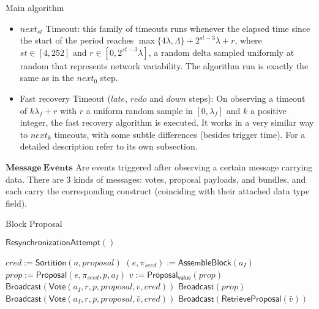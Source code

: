 \documentclass[10pt,a4paper]{article}
\begin{document}
\begin{section}{Main algorithm}
\begin{itemize}
    \item $next_{st}$ Timeout: this family of timeouts runs whenever the elapsed time since the start of the period reaches
    $\max\{4\lambda, \Lambda \} + 2^{st-3}\lambda + r$, where $st\in [4, 252]$ and $r \in [0, 2^{st-3}\lambda]$, a random 
    delta sampled uniformly at random that represents network variability.
    The algorithm run is exactly the same as in the $next_0$ step.

    \item Fast recovery Timeout ($late$, $redo$ and $down$ steps): On observing a timeout of $k\lambda_f + r$ with $r$ a uniform random sample in $[0, \lambda_f]$ and
    $k$ a positive integer, the fast recovery algorithm is executed. It works in a very similar way to $next_k$ timeouts, with some subtle differences (besides trigger time).
    For a detailed description refer to its own subsection.
\end{itemize}


$\mathbf{Message \ Events}$ Are events triggered after observing a certain message carrying data.
There are 3 kinds of messages: votes, proposal payloads, and bundles, and each carry
the corresponding construct (coinciding with their attached data type field).

\begin{subsection}{Block Proposal}\label{ssect:blockproposal}

    \begin{algorithm}
        \caption{\underline{Block Proposal}}
        \label{algo:block-proposal}
        \begin{algorithmic}[1]

            \State $\mathsf{ResynchronizationAttempt}()$

                \State $cred :=  \mathsf{Sortition}(a, proposal)$
                        \State $(e,\pi_{seed}) := \mathsf{AssembleBlock}(a_I)$
                        \State $prop := \mathsf{Proposal}(e, \pi_{seed}, p, a_I)$
                        \State $v := \mathsf{Proposal_{value}}(prop)$
                        \State $\mathsf{Broadcast}(\mathsf{Vote}(a_I, r, p, proposal, v, cred))$
                        \State $\mathsf{Broadcast}(prop)$
                    \Else
                        \State $\mathsf{Broadcast}(\mathsf{Vote}(a_I, r, p, proposal, \bar{v}, cred))$
                            \State $\mathsf{Broadcast}(\mathsf{RetrieveProposal}(\bar{v}))$
                        \EndIf
                    \EndIf
                \EndIf
            \EndFor
        \EndFunction
        \end{algorithmic}
    \end{algorithm}


\end{subsection}
\end{section}
\end{document}
